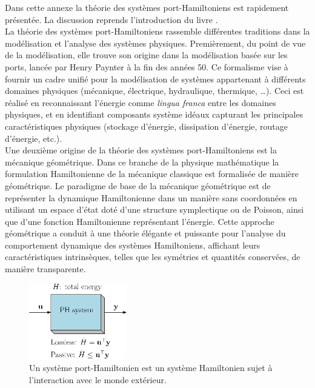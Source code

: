 \documentclass[12pt, french]{article}
\begin{document}
Dans cette annexe la théorie des systèmes port-Hamiltoniens est rapidement présentée. La discussion reprends l'introduction du livre \cite{van2014port}. \\

La théorie des systèmes port-Hamiltoniens rassemble différentes traditions dans la modélisation et l'analyse des systèmes physiques. Premièrement, du point de vue de la modélisation, elle trouve son origine dans la modélisation basée sur les ports, lancée par Henry Paynter à la fin des années 50. Ce formalisme vise à fournir un cadre unifié pour la modélisation de systèmes appartenant à différents domaines physiques (mécanique, électrique, hydraulique, thermique, \dots). Ceci est réalisé en reconnaissant l'énergie comme \textit{lingua franca} entre les domaines physiques, et en identifiant composants système idéaux capturant les principales caractéristiques physiques (stockage d'énergie, dissipation d'énergie, routage d'énergie, etc.).  \\

Une deuxième origine de la théorie des systèmes port-Hamiltoniens est la mécanique géométrique. Dans ce branche de la physique mathématique la formulation Hamiltonienne de la mécanique classique est formalisée de manière géométrique. Le paradigme de base
de la mécanique géométrique est de représenter la dynamique Hamiltonienne dans un
manière sans coordonnées en utilisant un espace d'état doté d'une structure symplectique ou de Poisson, ainsi que d'une fonction Hamiltonienne représentant l'énergie. Cette
approche géométrique a conduit à une théorie élégante et puissante pour
l'analyse du comportement dynamique des systèmes Hamiltoniens, affichant leurs caractéristiques intrinsèques, telles que les symétries et quantités conservées, de manière transparente. \\

\begin{figure}
	\begin{center}
		\includegraphics[width=0.38\textwidth]{sketch_PH.eps}
	\end{center}
	\caption{Un système port-Hamiltonien est un système Hamiltonien sujet \`a l'interaction avec le monde extérieur.}
	\label{fig:sketchPH}
\end{figure}
\end{document}
